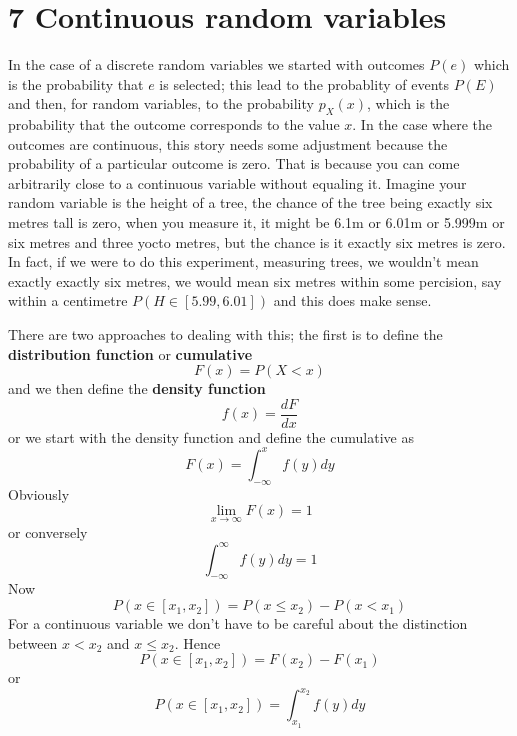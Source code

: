 \documentclass[11pt,a4paper]{scrartcl}
\begin{document}
\section*{7 Continuous random variables}

In the case of a discrete random variables we started with outcomes
$P(e)$ which is the probability that $e$ is selected; this lead to the
probablity of events $P(E)$ and then, for random variables, to the
probability $p_X(x)$, which is the probability that the outcome
corresponds to the value $x$. In the case where the outcomes are
continuous, this story needs some adjustment because the probability
of a particular outcome is zero. That is because you can come
arbitrarily close to a continuous variable without equaling
it. Imagine your random variable is the height of a tree, the chance
of the tree being exactly six metres tall is zero, when you measure
it, it might be 6.1m or 6.01m or 5.999m or six metres and three yocto
metres, but the chance is it exactly six metres is zero. In fact, if
we were to do this experiment, measuring trees, we wouldn't mean
exactly exactly six metres, we would mean six metres within some
percision, say within a centimetre $P(H\in [5.99,6.01])$ and this
does make sense.

There are two approaches to dealing with this; the first is to define
the \textbf{distribution function} or \textbf{cumulative}
\begin{equation}
F(x)=P(X<x)
\end{equation}
and we then define the \textbf{density function}
\begin{equation}
f(x)=\frac{dF}{dx}
\end{equation}
or we start with the density function and define the cumulative as
\begin{equation}
F(x)=\int_{-\infty}^x f(y)dy
\end{equation}
Obviously 
\begin{equation}
\lim_{x\rightarrow \infty}F(x)=1
\end{equation}
or conversely 
\begin{equation}
\int_{-\infty}^\infty f(y)dy=1
\end{equation}
Now
\begin{equation}
P(x\in [x_1,x_2])=P(x\le x_2)-P(x<x_1)
\end{equation}
For a continuous variable we don't have to be careful about the
distinction between $x<x_2$ and $x\le x_2$. Hence
\begin{equation}
P(x\in [x_1,x_2])=F(x_2)-F(x_1)
\end{equation}
or
\begin{equation}
P(x\in [x_1,x_2])=\int_{x_1}^{x_2} f(y)dy
\end{equation}
\end{document}

